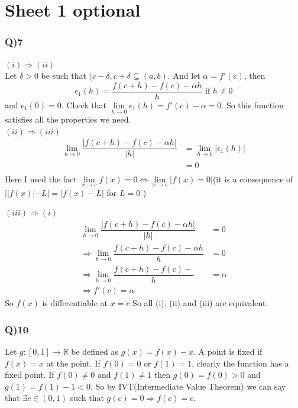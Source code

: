 \documentclass[11pt]{beamer}
\begin{document}
\section{Sheet 1 optional}
\begin{frame}
\frametitle{Q)7}
$(i)\Rightarrow (ii)$\\
Let $\delta>0$ be such that $(c-\delta,c+\delta \subseteq (a,b)$. And let $\alpha =f'(c)$, then 
$$\epsilon_1(h)=\dfrac{f(c+h)-f(c)-\alpha h}{h}\text{ if }h\neq 0$$
and $\epsilon_1(0)=0$. Check that $\underset{h \to 0}{\lim}\epsilon_1(h)=f'(c)-\alpha=0$. So this function satisfies all the properties we need.\\
$(ii)\Rightarrow (iii)$\\
\begin{align*}
\underset{h \to 0}{\lim}\dfrac{|f(c+h)-f(c)-\alpha h|}{|h|}&=\underset{h \to 0}{\lim}|\epsilon_1(h)|\\
&=0\\
\end{align*}
Here I used the fact $\underset{x \to c}{\lim}f(x)=0 \Leftrightarrow\underset{x \to c}{\lim}|f(x)=0|$(it is a consequence of $||f(x)|-L|=|f(x)-L|$ for $L=0$ )
\end{frame}
\begin{frame}
$(iii) \Rightarrow (i)$
\begin{align*}
\underset{h \to 0}{\lim}\dfrac{|f(c+h)-f(c)-\alpha h|}{|h|}&=0\\
\Rightarrow \underset{h \to 0}{\lim}\dfrac{f(c+h)-f(c)-\alpha h}{h}&=0\\
\Rightarrow \underset{h \to 0}{\lim}\dfrac{f(c+h)-f(c)-}{h}&=\alpha\\
\Rightarrow f'(c)=\alpha
\end{align*}
So $f(x)$ is differentiable at $x=c$
So all (i), (ii) and (iii) are equivalent.
\end{frame}
\begin{frame}
\frametitle{Q)10}
Let $g:[0,1]\rightarrow \mathbb{R}$ be defined as $g(x)=f(x)-x$. A point is fixed if $f(x)=x$ at the point. If $f(0)=0$ or $f(1)=1$, clearly the function has a fixed point. If $f(0)\neq 0$ and $f(1)\neq 1$ then $g(0)=f(0)>0$ and $g(1)=f(1)-1<0$. So by IVT(Intermediate Value Theorem) we can say that $\exists c\in (0,1)$ such that $g(c)=0\Rightarrow f(c)=c$.
\end{frame}
\end{document}
